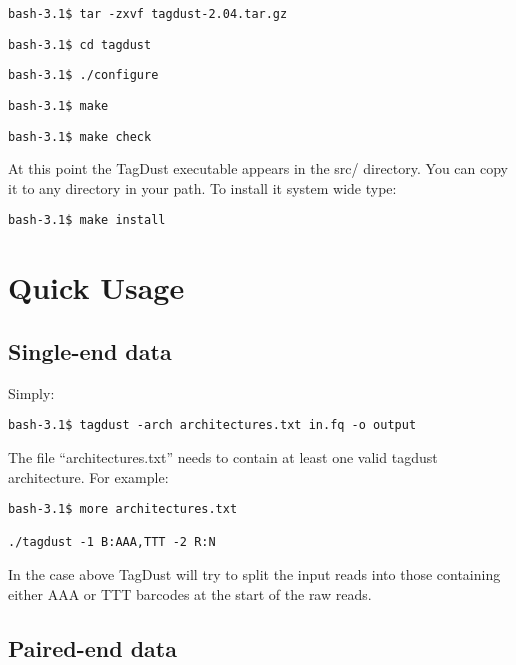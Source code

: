 \documentclass[11pt,a4paper,oneside]{book}
\begin{document}
\begin{verbatim}
bash-3.1$ tar -zxvf tagdust-2.04.tar.gz 
\end{verbatim}

\begin{verbatim}
bash-3.1$ cd tagdust
\end{verbatim}


\begin{verbatim}
bash-3.1$ ./configure
\end{verbatim}
\begin{verbatim}
bash-3.1$ make
\end{verbatim}

\begin{verbatim}
bash-3.1$ make check
\end{verbatim}
At this point the TagDust executable appears in the src/ directory. You can copy it to any directory in your path. To install it system wide type:  
\begin{verbatim}
bash-3.1$ make install
\end{verbatim}
\chapter{Quick Usage}

\section{Single-end data}

Simply:

\begin{verbatim}
bash-3.1$ tagdust -arch architectures.txt in.fq -o output
\end{verbatim}

The file ``architectures.txt'' needs to contain at least one valid tagdust architecture. For example: 


\begin{verbatim}
bash-3.1$ more architectures.txt

./tagdust -1 B:AAA,TTT -2 R:N 
\end{verbatim}

In the case above TagDust will try to split the input reads into those containing either AAA or TTT barcodes at the start of the raw reads. 

\section{Paired-end data}
\end{document}
